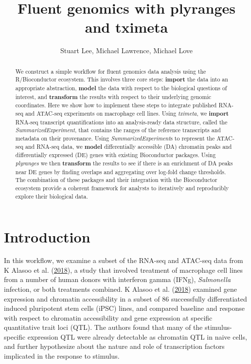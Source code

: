 \documentclass[
]{article}
\title{Fluent genomics with plyranges and tximeta}
\author{Stuart Lee, Michael Lawrence, Michael Love}
\date{}
\begin{document}
\maketitle
\begin{abstract}
We construct a simple workflow for fluent genomics data analysis using the R/Bioconductor ecosystem. This involves three core steps: \textbf{import} the data into an appropriate abstraction, \textbf{model} the data with respect to the biological questions of interest, and \textbf{transform} the results with respect to their underlying genomic coordinates. Here we show how to implement these steps to integrate published RNA-seq and ATAC-seq experiments on macrophage cell lines. Using \emph{tximeta}, we \textbf{import} RNA-seq transcript quantifications into an analysis-ready data structure, called the \emph{SummarizedExperiment}, that contains the ranges of the reference transcripts and metadata on their provenance. Using \emph{SummarizedExperiment}s to represent the ATAC-seq and RNA-seq data, we \textbf{model} differentially accessible (DA) chromatin peaks and differentially expressed (DE) genes with existing Bioconductor packages. Using \emph{plyranges} we then \textbf{transform} the results to see if there is an enrichment of DA peaks near DE genes by finding overlaps and aggregating over log-fold change thresholds. The combination of these packages and their integration with the Bioconductor ecosystem provide a coherent framework for analysts to iteratively and reproducibly explore their biological data.
\end{abstract}


























\hypertarget{introduction}{%
\section{Introduction}\label{introduction}}

In this workflow, we examine a subset of the RNA-seq and ATAC-seq data from
K Alasoo et al. (\protect\hyperlink{ref-alasoo}{2018}), a study that involved treatment of macrophage cell lines from a number
of human donors with interferon gamma (IFNg), \emph{Salmonella} infection, or both
treatments combined. K Alasoo et al. (\protect\hyperlink{ref-alasoo}{2018}) examined gene expression and chromatin
accessibility in a subset of 86 successfully differentiated induced pluripotent
stem cells (iPSC) lines, and compared baseline and response with respect to chromatin accessibility and gene expression at specific quantitative trait loci
(QTL). The authors found that many of the stimulus-specific expression QTL were already detectable as chromatin QTL in naive cells, and further hypothesize about the nature and role of transcription factors implicated in the response to
stimulus.
\end{document}
